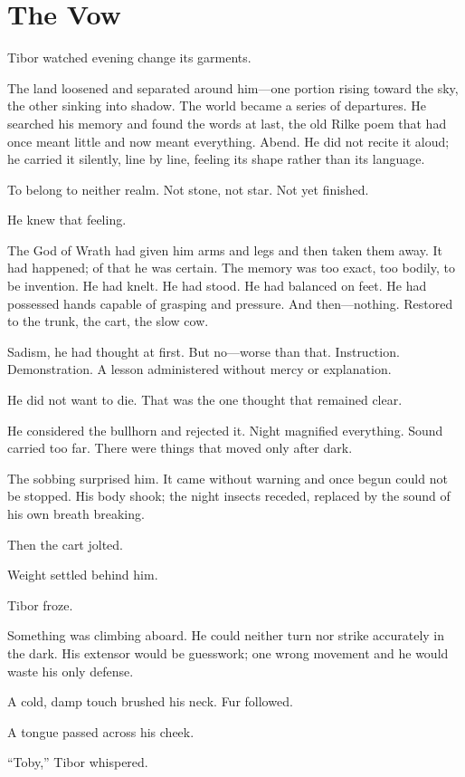 \chapter{The Vow}

Tibor watched evening change its garments.

The land loosened and separated around him—one portion rising toward the sky, the other sinking into shadow. The world became a series of departures. He searched his memory and found the words at last, the old Rilke poem that had once meant little and now meant everything. Abend. He did not recite it aloud; he carried it silently, line by line, feeling its shape rather than its language.

To belong to neither realm.
Not stone, not star.
Not yet finished.

He knew that feeling.

The God of Wrath had given him arms and legs and then taken them away. It had happened; of that he was certain. The memory was too exact, too bodily, to be invention. He had knelt. He had stood. He had balanced on feet. He had possessed hands capable of grasping and pressure. And then—nothing. Restored to the trunk, the cart, the slow cow.

Sadism, he had thought at first. But no—worse than that. Instruction. Demonstration. A lesson administered without mercy or explanation.

He did not want to die. That was the one thought that remained clear.

He considered the bullhorn and rejected it. Night magnified everything. Sound carried too far. There were things that moved only after dark.

The sobbing surprised him. It came without warning and once begun could not be stopped. His body shook; the night insects receded, replaced by the sound of his own breath breaking.

Then the cart jolted.

Weight settled behind him.

Tibor froze.

Something was climbing aboard. He could neither turn nor strike accurately in the dark. His extensor would be guesswork; one wrong movement and he would waste his only defense.

A cold, damp touch brushed his neck. Fur followed.

A tongue passed across his cheek.

“Toby,” Tibor whispered.

